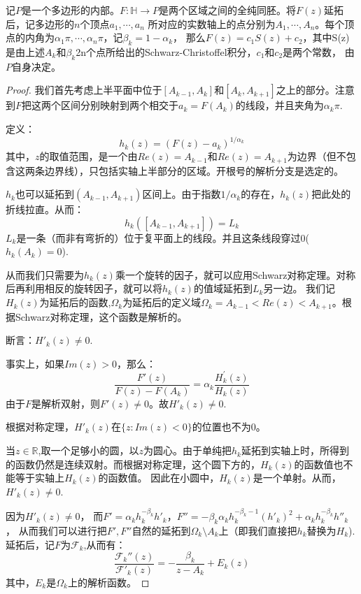 \documentclass[UTF8]{ctexart}[a4paper,10pt]
\def\R{\mathbb{R}}
\def\H{\mathbb{H}}
\begin{document}
    \begin{thm}
        记$P$是一个多边形的内部。$F:\H \to P$是两个区域之间的全纯同胚。将$F(z)$延拓后，记多边形的$n$个顶点$a_1,\cdots,a_n$
        所对应的实数轴上的点分别为$A_1,\cdots,A_n$。每个顶点的内角为$\alpha_1\pi,\cdots,\alpha_n\pi$，记$\beta_k=1-\alpha_k$，
        那么$F(z)=c_1S(z)+c_2$，其中S(z)是由上述$A_k$和$\beta_k$2n个点所给出的Schwarz-Christoffel积分，$c_1$和$c_2$是两个常数，
        由$P$自身决定。
    \end{thm}
    \begin{proof}
        我们首先考虑上半平面中位于$[A_{k-1},A_k]$和$[A_{k},A_{k+1}]$之上的部分。注意到$F$把这两个区间分别映射到两个相交于$a_k=F(A_k)$的线段，并且夹角为$\alpha_k\pi$.
        
        定义：
        $$
        h_k(z)=(F(z)-a_k)^{1/\alpha_k}
        $$
        其中，$z$的取值范围，是一个由$Re(z)=A_{k-1}$和$Re(z)=A_{k+1}$为边界（但不包含这两条边界线），只包括实轴上半部分的区域。开根号的解析分支是选定的。

        $h_k$也可以延拓到$(A_{k-1},A_{k+1})$区间上。由于指数$1/\alpha_k$的存在，$h_k(z)$把此处的折线拉直。从而：
        $$
        h_k([A_{k-1},A_{k+1}])=L_k
        $$
        $L_k$是一条（而非有弯折的）位于复平面上的线段。并且这条线段穿过$0$($h_k(A_k)=0$).
        
        从而我们只需要为$h_k(z)$乘一个旋转的因子，就可以应用Schwarz对称定理。对称后再利用相反的旋转因子，就可以将$h_k(z)$的值域延拓到$L_k$另一边。
        我们记$H_k(z)$为延拓后的函数,$\Omega_k$为延拓后的定义域$\Omega_k=A_{k-1}<Re(z)<A_{k+1}$。根据Schwarz对称定理，这个函数是解析的。
        
        断言：$H'_k(z)\neq 0$.

        事实上，如果$Im(z)>0$，那么：
        $$
        \frac{F'(z)}{F(z)-F(A_k)}=\alpha_k\frac{H^{'}_k(z)}{H_k(z)}
        $$
        由于$F$是解析双射，则$F'(z)\neq 0$。故$H'_k(z)\neq0$.

        根据对称定理，$H'_k(z)$在$\{z:Im(z)<0\}$的位置也不为$0$。

        当$z\in \R$,取一个足够小的圆，以$z$为圆心。由于单纯把$h_k$延拓到实轴上时，所得到的函数仍然是连续双射。而根据对称定理，这个圆下方的，$H_k(z)$的函数值也不能等于实轴上$H_k(z)$的函数值。
        因此在小圆中，$H_k(z)$是一个单射。从而，$H'_k(z)\neq 0$.

        因为$H'_k(z)\neq0$，
        而$F'=\alpha_kh_k^{-\beta_k}h'_k$，$F''=-\beta_k\alpha_kh_k^{-\beta_k-1}(h'_k)^2+\alpha_kh_k^{-\beta_k}h''_k$，
        从而我们可以进行把$F',F''$自然的延拓到$\Omega_k\setminus{A_k}$上（即我们直接把$h_k$替换为$H_k$).延拓后，记$F$为$\mathcal{F}_k$,从而有：
        $$
        \frac{\mathcal{F}_k''(z)}{\mathcal{F}'_k(z)}=-\frac{\beta_k}{z-A_k}+E_k(z)
        $$
        其中，$E_k$是$\Omega_k$上的解析函数。


\end{proof}
\end{document}
